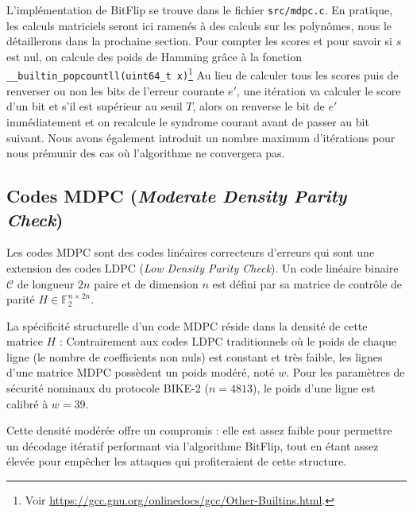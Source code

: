 \documentclass[11pt,a4paper]{article}
\begin{document}
L'implémentation de BitFlip se trouve dans le fichier \texttt{src/mdpc.c}.
En pratique, les calculs matriciels seront ici ramenés à des calculs sur les
polynômes, nous le détaillerons dans la prochaine section.
Pour compter les scores et pour savoir si $s$ est nul, on calcule des poids de
Hamming grâce à la fonction \texttt{\_\_builtin\_popcountll(uint64\_t
x)}\footnote{Voir
\url{https://gcc.gnu.org/onlinedocs/gcc/Other-Builtins.html}.}
Au lieu de calculer tous les scores puis de renverser ou non les bits de l'erreur
courante $e'$, une itération va calculer le score d'un bit et s'il est supérieur
au seuil $T$, alors on renverse le bit de $e'$ immédiatement et on recalcule le
syndrome courant avant de passer au bit suivant.
Nous avons également introduit un nombre maximum d'itérations pour nous prémunir
des cas où l'algorithme ne convergera pas.

\subsection{Codes MDPC (\textit{Moderate Density Parity Check})}

Les codes MDPC sont des codes linéaires correcteurs d'erreurs qui sont une
extension des codes LDPC (\textit{Low Density Parity Check}). Un code linéaire
binaire $\mathcal{C}$ de longueur $2n$ paire et de dimension $n$ est défini
par sa matrice de contrôle de parité $H \in \mathbb{F}_2^{n \times 2n}$. 

La spécificité structurelle d'un code MDPC réside dans la densité de cette
matrice $H$ :
Contrairement aux codes LDPC traditionnels où le poids de chaque ligne (le
nombre de coefficients non nuls) est constant et très faible, les lignes d'une
matrice MDPC possèdent un poids modéré, noté $w$.%
Pour les paramètres de sécurité nominaux du protocole BIKE-2 ($n = 4813$), le
poids d'une ligne est calibré à $w = 39$.


Cette densité modérée offre un compromis : elle est assez faible pour permettre
un décodage itératif performant via l'algorithme BitFlip, tout en étant assez
élevée pour empêcher les attaques qui profiteraient de cette structure.
\end{document}
